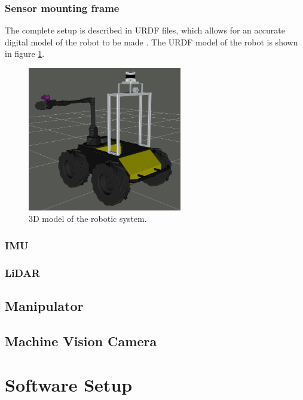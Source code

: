 \subsubsection{Sensor mounting frame}


The complete setup is described in URDF files, which allows for an accurate digital model of the robot to be made . The URDF model of the robot is shown in figure \ref{fig:hardware}.

\begin{figure}[H]
  \centering
  \includegraphics[width = 0.6\textwidth]{Figures/husky_initiated.png}
  \caption{3D model of the robotic system.}
  \label{fig:hardware}
\end{figure}

\subsubsection{IMU}

\subsubsection{LiDAR}

\subsection{Manipulator}

\subsection{Machine Vision Camera}

\section{Software Setup}

